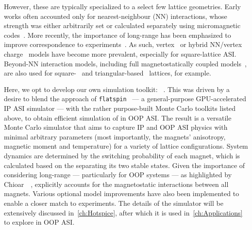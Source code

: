 However, these are typically specialized to a select few lattice geometries.
Early works often accounted only for nearest-neighbour (NN) interactions, whose strength was either arbitrarily set or calculated separately using micromagnetic codes~\cite{Qi2008,PerpendicularMagnetizationASI}. %
More recently, the importance of long-range  has been emphasized to improve correspondence to experiments~\cite{Chioar2014,Rougemaille2011,Brunn2021}.
As such, vertex~\cite{gilbert2014emergent,Saglam2022Tetris,Goryca2021Plasma,MeltingASI} or hybrid NN/vertex charge~\cite{Canals2016,zhang2013crystallites} models have become more prevalent, especially for square-lattice ASI. %
Beyond-NN interaction models, including full magnetostatically coupled models~\cite{ApparentFMpinwheel,mengotti2011kagome}, are also used for square-~\cite{Brunn2021,Farhan2013,sklenar2019field} and triangular-based~\cite{Chioar2014,Rougemaille2011,Hofhuis2020} lattices, for example. \par %
Here, we opt to develop our own simulation toolkit: \hotspice~\cite{MAES-24}.
This was driven by a desire to blend the approach of \texttt{flatspin}~\cite{flatspin} --- a general-purpose GPU-accelerated IP ASI simulator --- with the rather purpose-built Monte Carlo toolkits listed above, to obtain efficient simulation of  in OOP ASI.
The result is a versatile Monte Carlo simulator that aims to capture IP and OOP ASI physics with minimal arbitrary parameters (most importantly, the magnets' anisotropy, magnetic moment and temperature) for a variety of lattice configurations.
System dynamics are determined by the switching probability of each magnet, which is calculated based on the  separating its two stable states.
Given the importance of considering long-range  --- particularly for OOP systems --- as highlighted by Chioar~\etal~\cite{Chioar2014}, \hotspice{} explicitly accounts for the magnetostatic interactions between all magnets.
Various optional model improvements have also been implemented to enable a closer match to experiments.
The details of the \hotspice simulator will be extensively discussed in~\cref{ch:Hotspice}, after which it is used in~\cref{ch:Applications} to explore  in OOP ASI.
